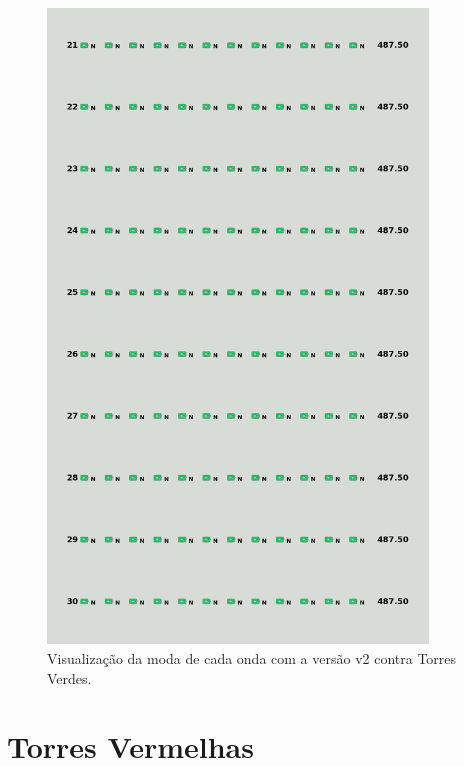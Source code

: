 \begin{figure}[H]
  \centering
  \includegraphics[width=0.9\textwidth]{figuras/td/td_allgreen_ai_mode_2_3.png}
  \caption{Visualização da moda de cada onda com a versão v2 contra Torres Verdes.}
  \label{fig:td-moda-green-2-3}
\end{figure}

\section{Torres Vermelhas}
\label{sec:apend-moda-td-r-v2}

